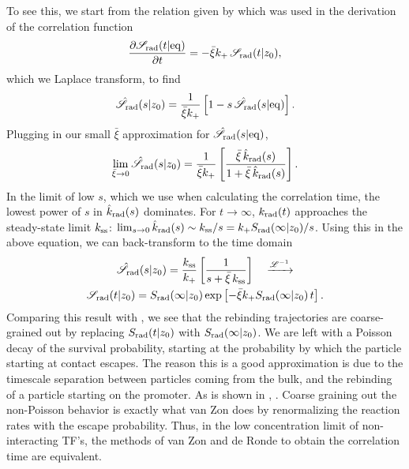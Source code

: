 To see this, we start from the relation given by  which was used in the derivation of the correlation function 
\begin{equation}
 \frac{\partial \mathscr{S}_{\rm rad}(t|{\rm eq})}{\partial t} = -\bar{\xi} k_+ \, \mathscr{S}_{\rm rad}(t|z_0),
\end{equation}
which we Laplace transform, to find
\begin{equation}
 \hat{\mathscr{S}}_{\rm rad}(s|z_0) = \frac{1}{\bar{\xi}k_+} \left[ 1 - s\,\hat{\mathscr{S}}_{\rm rad}(s|{\rm eq})\right].
\end{equation}
Plugging in our small $\bar{\xi}$ approximation for $\hat{\mathscr{S}}_{\rm rad}(s|{\rm eq})$, 
\begin{equation}
 \lim_{\bar{\xi}\to 0} \hat{\mathscr{S}}_{\rm rad}(s|z_0) = \frac{1}{\bar{\xi} k_+} \left[ \frac{\bar{\xi}\,\hat{k}_{\rm rad}(s)}{1 + \bar{\xi}\,\hat{k}_{\rm rad}(s)}\right].
\end{equation}
In the limit of low $s$, which we use when calculating the correlation time, the lowest power of $s$ in $\hat{k}_{\rm rad}(s)$ dominates. For $t\to\infty$, $k_{\rm rad}(t)$ approaches the steady-state limit $k_{\rm ss}$: $\lim_{s\to0} \hat{k}_{\rm rad}(s) \sim k_{\rm ss}/s = k_+ S_{\rm rad}(\infty|z_0)/s$. Using this in the above equation, we can back-transform to the time domain
\begin{multline}
 \hat{\mathscr{S}}_{\rm rad}(s|z_0) = \frac{k_{\rm ss}}{k_+} \left[ \frac{1}{s + \bar{\xi}\,k_{\rm ss}} \right] \quad \xrightarrow{\mathscr{L}^{-1}} \\ \mathscr{S}_{\rm rad}(t|z_0) = S_{\rm rad}(\infty|z_0)\,{\rm exp}\left[ -\bar{\xi} k_+ S_{\rm rad}(\infty|z_0)\,t \right].
\end{multline}
Comparing this result with , we see that the rebinding trajectories are coarse-grained out by replacing $S_{\rm rad}(t|z_0)$ with $S_{\rm rad}(\infty|z_0)$. We are left with a Poisson decay of the survival probability, starting at the probability by which the particle starting at contact escapes. The reason this is a good approximation is due to the timescale separation between particles coming from the bulk, and the rebinding of a particle starting on the promoter. As is shown in , . Coarse graining out the non-Poisson behavior is exactly what van Zon does by renormalizing the reaction rates with the escape probability. Thus, in the low concentration limit of non-interacting TF's, the methods of van Zon and de Ronde to obtain the correlation time are equivalent.


